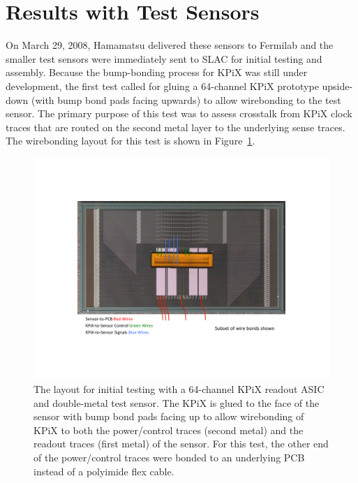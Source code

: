 \documentclass[prc,12pt,nofootinbib,letterpaper]{revtex4}
\begin{document}
\section{Results with Test Sensors}

On March 29, 2008, Hamamatsu delivered these sensors to Fermilab and the smaller test sensors were immediately sent to SLAC for initial testing and assembly.  Because the bump-bonding process for KPiX was still under development, the first test called for gluing a 64-channel KPiX prototype upside-down (with bump bond pads facing upwards) to allow wirebonding to the test sensor.  The primary purpose of this test was to assess crosstalk from KPiX clock traces that are routed on the second metal layer to the underlying sense traces. The wirebonding layout for this test is shown in Figure~\ref{fig:wirebond-test}. 
\begin{figure}[htb]
\begin{center}
    \includegraphics[width=6in]{figures/wirebond-test}
\caption{The layout for initial testing with a 64-channel KPiX readout ASIC and double-metal test sensor.  The KPiX is glued to the face of the sensor with bump bond pads facing up to allow wirebonding of KPiX to both the power/control traces (second metal) and the readout traces (first metal) of the sensor.  For this test, the other end of the power/control traces were bonded to an underlying PCB instead of a polyimide flex cable.}
\label{fig:wirebond-test}
\end{center}
\end{figure}
\end{document}

